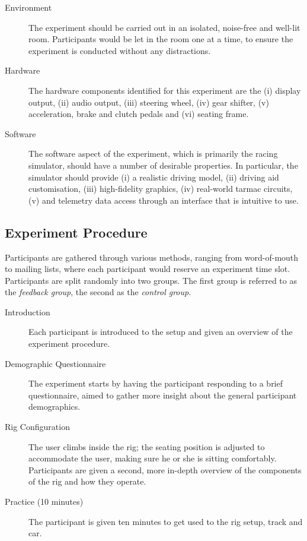 \documentclass{sig-alternate}
\begin{document}
{\begin{description}
	\item [Environment] The experiment should be carried out in an isolated, noise-free and well-lit room. Participants would be let in the room one at a time, to ensure the experiment is conducted without any distractions.
	\item [Hardware] The hardware components identified for this experiment are the (i) display output, (ii) audio output, (iii) steering wheel, (iv) gear shifter, (v) acceleration, brake and clutch pedals and (vi) seating frame.
	\item [Software] The software aspect of the experiment, which is primarily the racing simulator, should have a number of desirable properties. In particular, the simulator should provide (i) a realistic driving model, (ii) driving aid customisation, (iii) high-fidelity graphics, (iv) real-world tarmac circuits, (v) and telemetry data access through an interface that is intuitive to use.
\end{description}

\subsection{Experiment Procedure}
Participants are gathered through various methods, ranging from word-of-mouth to mailing lists, where each participant would reserve an experiment time slot. Participants are split randomly into two groups. The first group is referred to as the \emph{feedback group}, the second as the \emph{control group}.

\begin{description}
	\item[Introduction] Each participant is introduced to the setup and given an overview of the experiment procedure. 
	
	\item[Demographic Questionnaire] The experiment starts by having the participant responding to a brief questionnaire, aimed to gather more insight about the general participant demographics.
	
	\item[Rig Configuration] 
	The user climbs inside the rig; the seating position is adjusted to accommodate the user, making sure he or she is sitting comfortably. Participants are given a second, more in-depth overview of the components of the rig and how they operate.
	
	\item[Practice (10 minutes)] The participant is given ten minutes to get used to the rig setup, track and car.
	

\end{description}}
\end{document}
